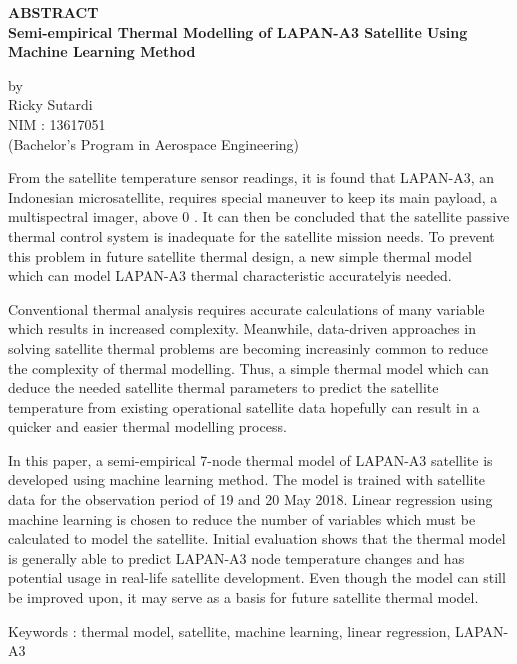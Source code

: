\newpage

\begin{center}
       \Large
       \textbf{ABSTRACT} \\
        \vspace{1.5cm}
        \large
        \textbf{Semi-empirical Thermal Modelling of LAPAN-A3 Satellite Using Machine Learning Method}\\
        
        \vspace{1.5cm}
        
        by\\
        Ricky Sutardi\\
        NIM : 13617051\\
        (Bachelor's Program in Aerospace Engineering)\\
        \vspace{1.5cm}
\end{center}

From the satellite temperature sensor readings, it is found that LAPAN-A3, an
Indonesian microsatellite, requires special maneuver to keep its main payload,
a multispectral imager, above 0 \degree. It can then be concluded that the
satellite passive thermal control system is inadequate for the satellite
mission needs. To prevent this problem in future satellite thermal design, a
new simple thermal model which can model LAPAN-A3 thermal characteristic accuratelyis needed.

Conventional thermal analysis requires accurate calculations of many variable
which results in increased complexity. Meanwhile, data-driven approaches in
solving satellite thermal problems are becoming increasinly common to reduce
the complexity of thermal modelling. Thus, a simple thermal model which can
deduce the needed satellite thermal parameters to predict the satellite
temperature from existing operational satellite data hopefully can result in a
quicker and easier thermal modelling process.

In this paper, a semi-empirical 7-node thermal model of LAPAN-A3 satellite is
developed using machine learning method. The model is trained with satellite
data for the observation period of 19 and 20 May 2018. Linear regression using
machine learning is chosen to reduce the number of variables which must be
calculated to model the satellite. Initial evaluation shows that the thermal
model is generally able to predict LAPAN-A3 node temperature changes and has
potential usage in real-life satellite development. Even though the model can
still be improved upon, it may serve as a basis for future satellite thermal
model.

\vspace{1.0cm}
\noindent 
Keywords : thermal model, satellite, machine learning, linear regression, LAPAN-A3 
